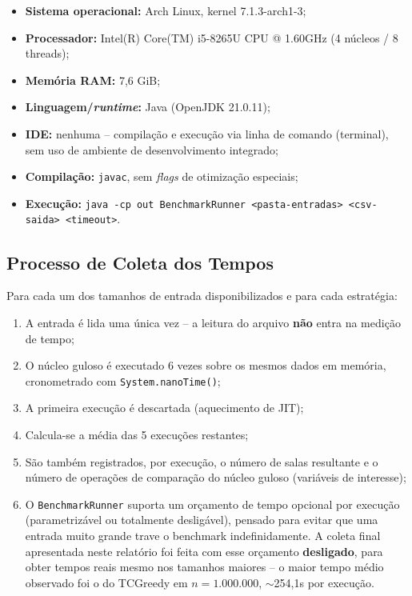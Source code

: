 \documentclass[12pt]{article}
\begin{document}
\begin{itemize}
\item \textbf{Sistema operacional:} Arch Linux, kernel 7.1.3-arch1-3;
\item \textbf{Processador:} Intel(R) Core(TM) i5-8265U CPU @ 1.60GHz
  (4 núcleos / 8 threads);
\item \textbf{Memória RAM:} 7,6 GiB;
\item \textbf{Linguagem/\textit{runtime}:} Java (OpenJDK 21.0.11);
\item \textbf{IDE:} nenhuma -- compilação e execução via linha de
  comando (terminal), sem uso de ambiente de desenvolvimento integrado;
\item \textbf{Compilação:} \texttt{javac}, sem \textit{flags} de
  otimização especiais;
\item \textbf{Execução:} \texttt{java -cp out BenchmarkRunner
  <pasta-entradas> <csv-saida> <timeout>}.
\end{itemize}

\subsection{Processo de Coleta dos Tempos}

Para cada um dos tamanhos de entrada disponibilizados e para cada
estratégia:

\begin{enumerate}
\item A entrada é lida uma única vez -- a leitura do arquivo \textbf{não}
  entra na medição de tempo;
\item O núcleo guloso é executado 6 vezes sobre os mesmos dados em
  memória, cronometrado com \texttt{System.nanoTime()};
\item A primeira execução é descartada (aquecimento de JIT);
\item Calcula-se a média das 5 execuções restantes;
\item São também registrados, por execução, o número de salas resultante
  e o número de operações de comparação do núcleo guloso (variáveis de
  interesse);
\item O \texttt{BenchmarkRunner} suporta um orçamento de tempo opcional
  por execução (parametrizável ou totalmente desligável), pensado para
  evitar que uma entrada muito grande trave o benchmark indefinidamente.
  A coleta final apresentada neste relatório foi feita com esse orçamento
  \textbf{desligado}, para obter tempos reais mesmo nos tamanhos maiores
  -- o maior tempo médio observado foi o do TCGreedy em $n=1.000.000$,
  $\sim$254,1s por execução.
\end{enumerate}
\end{document}
